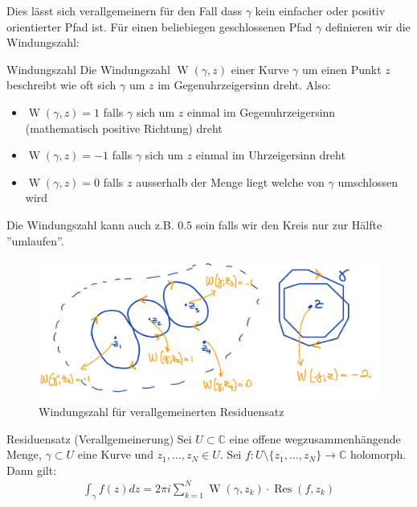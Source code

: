 \documentclass[a4paper,10pt]{article}
\begin{document}
Dies lässt sich verallgemeinern für den Fall dass $\gamma$ kein einfacher oder positiv orientierter Pfad ist. Für einen beliebiegen geschlossenen Pfad $\gamma$ definieren wir die Windungszahl:

\begin{subbox}{Windungszahl}
  Die Windungszahl \(\operatorname{W}(\gamma,z)\) einer Kurve \(\gamma\) um einen Punkt \(z\) beschreibt wie oft sich \(\gamma\) um \(z\) im Gegenuhrzeigersinn dreht. Also: 
  \begin{itemize}
    \item \(\operatorname{W}(\gamma,z) = 1\) falls $\gamma$ sich um $z$ einmal im Gegenuhrzeigersinn (mathematisch positive Richtung) dreht
    \item \(\operatorname{W}(\gamma,z) = -1\) falls $\gamma$ sich um $z$ einmal im Uhrzeigersinn dreht
    \item \(\operatorname{W}(\gamma,z) = 0\) falls $z$ ausserhalb der Menge liegt welche von $\gamma$ umschlossen wird 
  \end{itemize}
  Die Windungszahl kann auch z.B. $0.5$ sein falls wir den Kreis nur zur Hälfte ''umlaufen''.
\end{subbox}

\begin{figure}[H]
  \centering 
  \includegraphics[width=0.9\linewidth]{assets/4-2-2.png}
  \caption{Windungszahl für verallgemeinerten Residuensatz}
\end{figure}

\begin{subbox}{Residuensatz (Verallgemeinerung)}
  Sei \(U\subset\mathbb{C}\) eine offene wegzusammenhängende Menge, \(\gamma\subset U\) eine Kurve und \(z_1,\dots,z_N\in U\). Sei \(f\colon U\setminus\{z_1,\dots,z_N\}\to \mathbb{C}\) holomorph. Dann gilt: \begin{align*} \int_{\gamma} f(z)dz = 2\pi i \sum_{k=1}^N \operatorname{W}(\gamma ,z_k) \cdot \operatorname{Res}(f,z_k) \end{align*}
\end{subbox}
\end{document}
